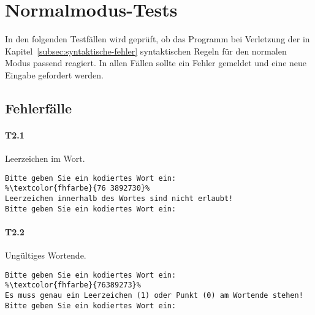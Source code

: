 \begin{center}
    \label{fig:wbuch2}
\end{center}


\section{Normalmodus-Tests}\label{sec:normalmodus-tests}
In den folgenden Testfällen wird geprüft, ob das Programm bei Verletzung der in Kapitel~\ref{subsec:syntaktische-fehler} syntaktischen Regeln für den normalen Modus passend reagiert.
In allen Fällen sollte ein Fehler gemeldet und eine neue Eingabe gefordert werden.

\subsection*{Fehlerfälle}\label{subsec:normalmodus-fehlerfaelle}

\paragraph*{T2.1} Leerzeichen im Wort.
\begin{lstlisting}[escapechar=\%]
Bitte geben Sie ein kodiertes Wort ein:
%\textcolor{fhfarbe}{76 3892730}%
Leerzeichen innerhalb des Wortes sind nicht erlaubt!
Bitte geben Sie ein kodiertes Wort ein:
\end{lstlisting}

\paragraph*{T2.2} Ungültiges Wortende.
\begin{lstlisting}[escapechar=\%]
Bitte geben Sie ein kodiertes Wort ein:
%\textcolor{fhfarbe}{76389273}%
Es muss genau ein Leerzeichen (1) oder Punkt (0) am Wortende stehen!
Bitte geben Sie ein kodiertes Wort ein:
\end{lstlisting}

